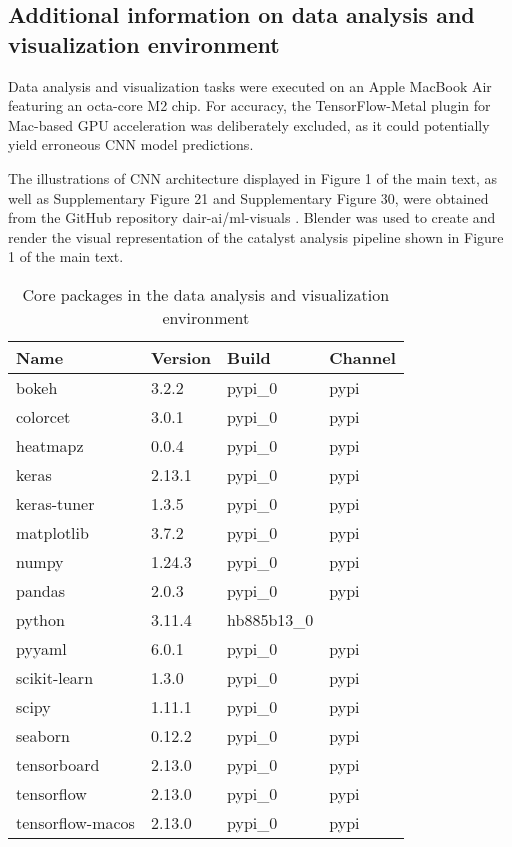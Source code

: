 \subsection{Additional information on data analysis and visualization environment}
Data analysis and visualization tasks were executed on an Apple MacBook Air featuring an octa-core M2 chip.
For accuracy, the TensorFlow-Metal plugin for Mac-based GPU acceleration was deliberately excluded,
as it could potentially yield erroneous CNN model predictions.

The illustrations of CNN architecture displayed in Figure 1 of the main text,
as well as  Supplementary Figure 21 and Supplementary Figure 30,
were obtained from the GitHub repository dair-ai/ml-visuals \cite{Saravia_ML_Visuals_2021}.
Blender was used to create and render the visual representation of the catalyst analysis pipeline shown in Figure 1 of the main text.

\begin{table}[h]
  \centering
  \begin{tabular}{llll}
    \hline
    Name             & Version & Build      & Channel \\
    \hline
    bokeh            & 3.2.2   & pypi_0     & pypi    \\
    colorcet         & 3.0.1   & pypi_0     & pypi    \\
    heatmapz         & 0.0.4   & pypi_0     & pypi    \\
    keras            & 2.13.1  & pypi_0     & pypi    \\
    keras-tuner      & 1.3.5   & pypi_0     & pypi    \\
    matplotlib       & 3.7.2   & pypi_0     & pypi    \\
    numpy            & 1.24.3  & pypi_0     & pypi    \\
    pandas           & 2.0.3   & pypi_0     & pypi    \\
    python           & 3.11.4  & hb885b13_0 &         \\
    pyyaml           & 6.0.1   & pypi_0     & pypi    \\
    scikit-learn     & 1.3.0   & pypi_0     & pypi    \\
    scipy            & 1.11.1  & pypi_0     & pypi    \\
    seaborn          & 0.12.2  & pypi_0     & pypi    \\
    tensorboard      & 2.13.0  & pypi_0     & pypi    \\
    tensorflow       & 2.13.0  & pypi_0     & pypi    \\
    tensorflow-macos & 2.13.0  & pypi_0     & pypi    \\
    \hline
  \end{tabular}
  \caption{Core packages in the data analysis and visualization environment}
  \label{si_table20}
\end{table}
